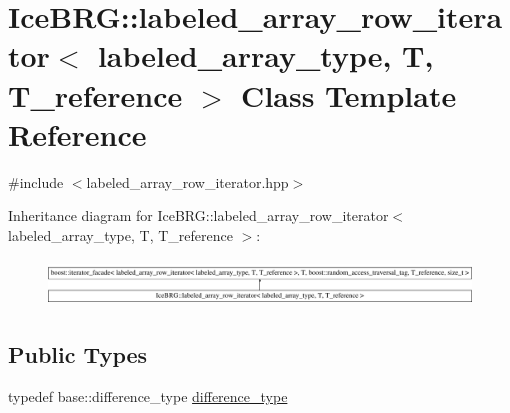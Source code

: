 \hypertarget{classIceBRG_1_1labeled__array__row__iterator}{}\section{Ice\+B\+R\+G\+:\+:labeled\+\_\+array\+\_\+row\+\_\+iterator$<$ labeled\+\_\+array\+\_\+type, T, T\+\_\+reference $>$ Class Template Reference}
\label{classIceBRG_1_1labeled__array__row__iterator}


{\ttfamily \#include $<$labeled\+\_\+array\+\_\+row\+\_\+iterator.\+hpp$>$}

Inheritance diagram for Ice\+B\+R\+G\+:\+:labeled\+\_\+array\+\_\+row\+\_\+iterator$<$ labeled\+\_\+array\+\_\+type, T, T\+\_\+reference $>$\+:\begin{figure}[H]
\begin{center}
\leavevmode
\includegraphics[height=1.244444cm]{classIceBRG_1_1labeled__array__row__iterator}
\end{center}
\end{figure}
\subsection*{Public Types}
\begin{DoxyCompactItemize}
\item 
typedef base\+::difference\+\_\+type \hyperlink{classIceBRG_1_1labeled__array__row__iterator_a3ac7f5a854882d443faaef1ae3ef3c9d}{difference\+\_\+type}
\end{DoxyCompactItemize}
